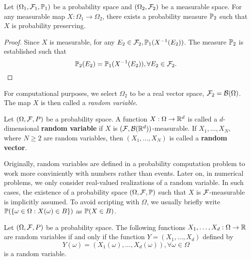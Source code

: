 \begin{theorem}
  \label{theorem:probability-measure-wrt-measurable-map}
  Let $(\Omega_1, \mathcal{F}_1, \mathbb{P}_1)$ be a probability space and $(\Omega_2, \mathcal{F}_2)$ be a measurable space. For any measurable map $X : \Omega_1 \to \Omega_2$, there exists a probability measure $\mathbb{P}_2$ such that $X$ is probability preserving.
\end{theorem}

\begin{proof}
  Since $X$ is measurable, for any $E_2 \in \mathcal{F}_2, \mathbb{P}_1(X^{-1}(E_2))$. The measure $\mathbb{P}_2$ is established such that
  $$\mathbb{P}_2(E_2) = \mathbb{P}_1(X^{-1}(E_2)), \forall E_2 \in \mathcal{F}_2.$$
\end{proof}

For computational purposes, we select $\Omega_2$ to be a real vector space, $\mathcal{F}_2 = \mathcal{B}(\Omega)$. The map $X$ is then called a \textit{random variable}.

\begin{definition}
  \label{definition:random-variable}
  Let $(\Omega, \mathcal{F}, P)$ be a probability space. A function $X:\Omega\to\mathbb{R}^d$ is called a $d$-dimensional \textbf{random variable} if $X$ is $(\mathcal{F},\mathcal{B}(\mathbb{R}^d))$-measurable. If $X_1,\ldots, X_N$, where $N\ge 2$ are random variables, then $(X_1,\ldots,X_N)$ is called a \textbf{random vector}.
\end{definition}

Originally, random variables are defined in a probability computation problem to work more conviniently with numbers rather than events. Later on, in numerical problems, we only consider real-valued realizations of a random variable. In such cases, the existence of a probability space $(\Omega, \mathcal{F}, \mathbb{P})$ such that $X$ is $\mathcal{F}$-measurable is implicitly assumed. To avoid scripting with $\Omega$, we usually briefly write $\mathbb{P}(\{\omega\in\Omega : X(\omega)\in B\})$ as $\mathbb{P}(X\in B)$.

\begin{proposition}
  \label{proposition-random-vector-is-random-variable}
  Let $(\Omega, \mathcal{F}, P)$ be a probability space. The following functions $X_1,\ldots,X_d: \Omega\to\mathbb{R}$ are random variables if and only if the function $Y=(X_1,\ldots, X_d)$ defined by
  $$Y(\omega) = (X_1(\omega),\ldots, X_d(\omega)), \forall \omega\in\Omega$$
  is a random variable.
\end{proposition}

